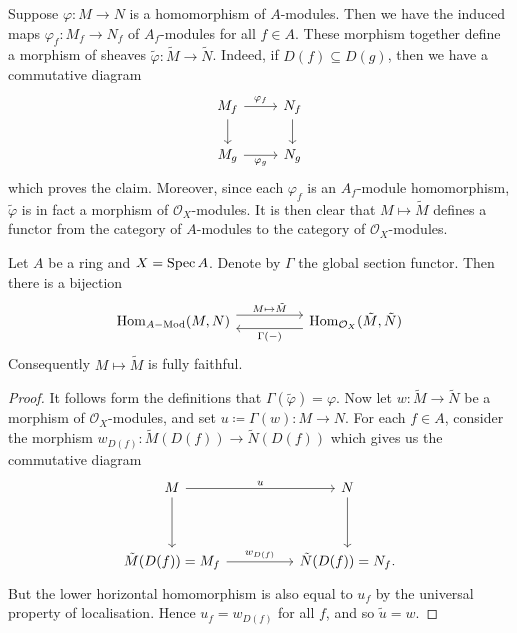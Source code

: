 Suppose $\varphi \colon M \to N$ is a homomorphism of $A$-modules. Then we have the induced maps $\varphi_f \colon M_f \to N_f$ of $A_f$-modules for all $f \in A$. These morphism together define a morphism of sheaves $\tilde{\varphi}\colon \tilde{M} \to \tilde{N}$. Indeed, if $D(f) \subseteq D(g)$, then we have a commutative diagram
\[\begin{tikzcd}
	{M_f} & {N_f} \\
	{M_g} & {N_g}
	\arrow["{\varphi_f}", from=1-1, to=1-2]
	\arrow[from=1-1, to=2-1]
	\arrow[from=1-2, to=2-2]
	\arrow["{\varphi_g}"', from=2-1, to=2-2]
\end{tikzcd}\]
which proves the claim. Moreover, since each $\varphi_f$ is an $A_f$-module homomorphism, $\tilde{\varphi}$ is in fact a morphism of $\mathcal{O}_X$-modules. It is then clear that $M \mapsto \tilde{M}$ defines a functor from the category of $A$-modules to the category of $\mathcal{O}_X$-modules.

\begin{theorem}
	Let $A$ be a ring and $X = \operatorname{Spec} A$. Denote by $\Gamma$ the global section functor. Then there is a bijection
	\[\begin{tikzcd}
		{\Hom_{A-\mathrm{Mod}}(M, N)} && {\Hom_{\mathcal{O}_X}(\tilde{M}, \tilde{N})}
		\arrow["{M \mapsto \tilde{M}}", shift left=2, from=1-1, to=1-3]
		\arrow["{\Gamma(-)}", shift left=2, from=1-3, to=1-1]
	\end{tikzcd}\]
	Consequently $M \mapsto \tilde{M}$ is fully faithful.
\end{theorem}
\begin{proof}
	It follows form the definitions that $\Gamma(\tilde{\varphi}) = \varphi$. Now let $w \colon\tilde{M}\to \tilde{N}$ be a morphism of $\mathcal{O}_X$-modules, and set $u \coloneqq \Gamma(w) \colon M \to N$. For each $f \in A$, consider the morphism $w_{D(f)} \colon \tilde{M}(D(f)) \to \tilde{N}(D(f))$ which gives us the commutative diagram
	\[\begin{tikzcd}
		M && N \\
		\\
		{\tilde{M}(D(f)) = M_f} && {\tilde{N}(D(f)) = N_f.}
		\arrow["{u}", from=1-1, to=1-3]
		\arrow[from=1-1, to=3-1]
		\arrow[from=1-3, to=3-3]
		\arrow["{w_{D(f)}}", from=3-1, to=3-3]
	\end{tikzcd}\]
	But the lower horizontal homomorphism is also equal to $u_f$ by the universal property of localisation. Hence $u_f = w_{D(f)}$ for all $f$, and so $\tilde{u} = w$.
\end{proof}

